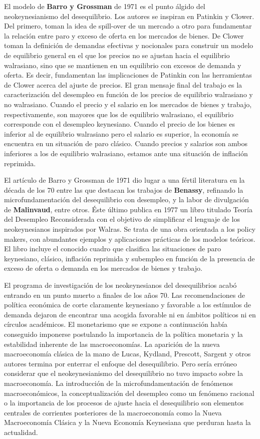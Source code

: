 \documentclass{nuevotema}
\begin{document}
El modelo de \textbf{Barro y Grossman} de 1971 es el punto álgido del neokeynesianismo del desequilibrio. Los autores se inspiran en Patinkin y Clower. Del primero, toman la idea de spill-over de un mercado a otro para fundamentar la relación entre paro y exceso de oferta en los mercados de bienes. De Clower toman la definición de demandas efectivas y nocionales para construir un modelo de equilibrio general en el que los precios no se ajustan hacia el equilibrio walrasiano, sino que se mantienen en un equilibrio con excesos de demanda y oferta. Es decir, fundamentan las implicaciones de Patinkin con las herramientas de Clower acerca del ajuste de precios. El gran mensaje final del trabajo es la caracterización del desempleo en función de los precios de equilibrio walrasiano y no walrasiano. Cuando el precio y el salario en los mercados de bienes y trabajo, respectivamente, son mayores que los de equilibrio walrasiano, el equilibrio corresponde con el desempleo keynesiano. Cuando el precio de los bienes es inferior al de equilibrio walrasiano pero el salario es superior, la economía se encuentra en un situación de paro clásico. Cuando precios y salarios son ambos inferiores a los de equilibrio walrasiano, estamos ante una situación de inflación reprimida. 

El artículo de Barro y Grossman de 1971 dio lugar a una fértil literatura en la década de los 70 entre las que destacan los trabajos de \textbf{Benassy}, refinando la microfundamentación del desequilibrio con desempleo, y la labor de divulgación de \textbf{Malinvaud}, entre otros. Éste último publica en 1977 un libro titulado Teoría del Desempleo Reconsiderada con el objetivo de simplificar el lenguaje de los neokeynesianos inspirados por Walras. Se trata de una obra orientada a los policy makers, con abundantes ejemplos y aplicaciones prácticas de los modelos teóricos. El libro incluye el conocido cuadro que clasifica las situaciones de paro keynesiano, clásico, inflación reprimida y subempleo en función de la presencia de exceso de oferta o demanda en los mercados de bienes y trabajo. 

El programa de investigación de los neokeynesianos del desequilibrios acabó entrando en un punto muerto a finales de los años 70. Las recomendaciones de política económica de corte claramente keynesiano y favorable a los estímulos de demanda dejaron de encontrar una acogida favorable ni en ámbitos políticos ni en círculos académicos. El monetarismo que se expone a continuación había conseguido imponerse postulando la importancia de la política monetaria y la estabilidad inherente de las macroeconomías. La aparición de la nueva macroeconomía clásica de la mano de Lucas, Kydland, Prescott, Sargent y otros autores termina por enterrar el enfoque del desequilibrio. Pero sería erróneo considerar que el neokeynesianismo del desequilibrio no tuvo impacto sobre la macroeconomía. La introducción de la microfundamentación de fenómenos macroeconómicos, la conceptualización del desempleo como un fenómeno racional o la importancia de los procesos de ajuste hacia el desequilibrio son elementos centrales de corrientes posteriores de la macroeconomía como la Nueva Macroeconomía Clásica y la Nueva Economía Keynesiana que perduran hasta la actualidad.
\end{document}
